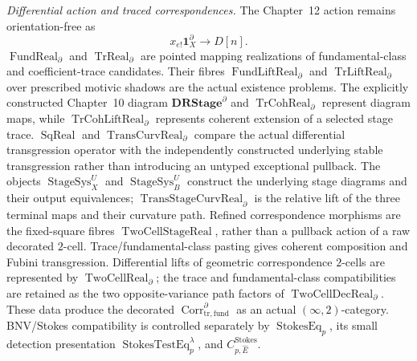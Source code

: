 \begin{theorem}
\medskip
\noindent\emph{Differential action and traced correspondences.}
The Chapter~12 action remains orientation-free as
\[
x_{e!}\mathbf1_X^\partial\longrightarrow D[n].
\]
$\operatorname{FundReal}_{\partial}$ and
$\operatorname{TrReal}_{\partial}$ are pointed mapping realizations of
fundamental-class and coefficient-trace candidates.  Their fibres
$\operatorname{FundLiftReal}_{\partial}$ and
$\operatorname{TrLiftReal}_{\partial}$ over prescribed motivic shadows are the
actual existence problems.  The explicitly constructed Chapter~10 diagram
$\mathbf{DRStage}^{\partial}$ and
$\operatorname{TrCohReal}_{\partial}$ represent diagram maps, while
$\operatorname{TrCohLiftReal}_{\partial}$ represents coherent extension of a
selected stage trace.
$\operatorname{SqReal}$ and $\operatorname{TransCurvReal}_{\partial}$ compare
the actual differential transgression operator with the independently constructed
underlying stable transgression rather than introducing an untyped exceptional
pullback.  The objects $\operatorname{StageSys}_X^U$ and
$\operatorname{StageSys}_B^U$ construct the underlying stage diagrams and their
output equivalences; $\operatorname{TransStageCurvReal}_{\partial}$ is the
relative lift of the three terminal maps and their curvature path.  Refined
correspondence morphisms are the fixed-square fibres
$\operatorname{TwoCellStageReal}$, rather than a pullback action of a raw
decorated $2$-cell.  Trace/fundamental-class pasting gives coherent
composition and Fubini transgression.  Differential lifts of geometric
correspondence $2$-cells are represented by
$\operatorname{TwoCellReal}_{\partial}$; the trace and fundamental-class
compatibilities are retained as the two opposite-variance path factors of
$\operatorname{TwoCellDecReal}_{\partial}$.  These data produce the decorated
$\operatorname{Corr}^{\partial}_{\mathrm{tr,fund}}$ as an actual
$(\infty,2)$-category.  BNV/Stokes compatibility is controlled separately by
$\operatorname{StokesEq}_p$, its small detection presentation
$\operatorname{StokesTestEq}_p^\lambda$, and
$C^{\mathrm{Stokes}}_{p,\widehat E}$.


\end{theorem}
